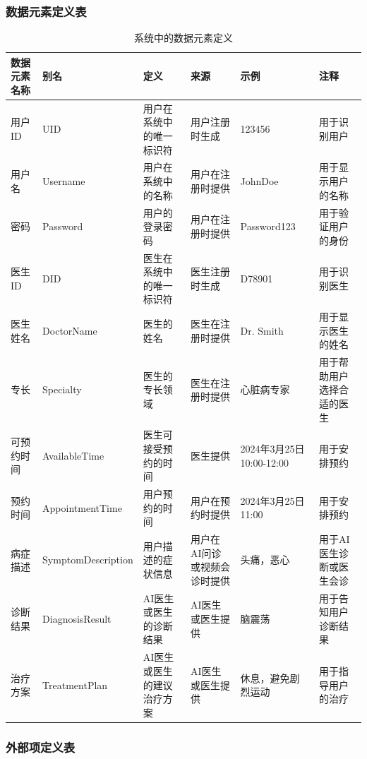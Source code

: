 \subsubsection{数据元素定义表}
\begin{table}[htbp]
	\centering
	\begin{tabular}{||p{2cm}|l|p{3cm}|p{2cm}|p{2cm}||p{3cm}|}
		\hline
		\textbf{数据元素名称} & \textbf{别名} & \textbf{定义} & \textbf{来源} & \textbf{示例} & \textbf{注释} \\
		\hline
		用户ID & UID & 用户在系统中的唯一标识符 & 用户注册时生成 & 123456 & 用于识别用户 \\
		用户名 & Username & 用户在系统中的名称 & 用户在注册时提供 & JohnDoe & 用于显示用户的名称 \\
		密码 & Password & 用户的登录密码 & 用户在注册时提供 & Password123 & 用于验证用户的身份 \\
		医生ID & DID & 医生在系统中的唯一标识符 & 医生注册时生成 & D78901 & 用于识别医生 \\
		医生姓名 & DoctorName & 医生的姓名 & 医生在注册时提供 & Dr. Smith & 用于显示医生的姓名 \\
		专长 & Specialty & 医生的专长领域 & 医生在注册时提供 & 心脏病专家 & 用于帮助用户选择合适的医生 \\
		可预约时间 & AvailableTime & 医生可接受预约的时间 & 医生提供 & 2024年3月25日 10:00-12:00 & 用于安排预约 \\
		预约时间 & AppointmentTime & 用户预约的时间 & 用户在预约时提供 & 2024年3月25日 11:00 & 用于安排预约 \\
		病症描述 & SymptomDescription & 用户描述的症状信息 & 用户在AI问诊或视频会诊时提供 & 头痛，恶心 & 用于AI医生诊断或医生会诊 \\
		诊断结果 & DiagnosisResult & AI医生或医生的诊断结果 & AI医生或医生提供 & 脑震荡 & 用于告知用户诊断结果 \\
		治疗方案 & TreatmentPlan & AI医生或医生的建议治疗方案 & AI医生或医生提供 & 休息，避免剧烈运动 & 用于指导用户的治疗 \\
		\hline
	\end{tabular}
	\caption{系统中的数据元素定义}
	\label{tab:data_elements}
\end{table}
\newpage

\subsubsection{外部项定义表}

